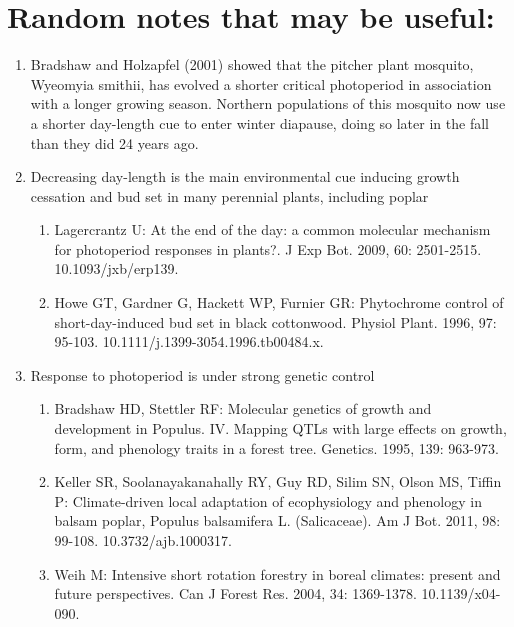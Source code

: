 \documentclass{article}
\begin{document}
\section* {Random notes that may be useful:}
\begin {enumerate}
\item Bradshaw and Holzapfel (2001) showed that the pitcher plant mosquito,
Wyeomyia smithii, has evolved a shorter critical photoperiod in association with a
longer growing season. Northern populations of this mosquito now use a shorter
day-length cue to enter winter diapause, doing so later in the fall than they did
24 years ago.
\item Decreasing day-length is the main environmental cue inducing growth cessation and bud set in many perennial plants, including poplar 
\begin{enumerate}

\item Lagercrantz U: At the end of the day: a common molecular mechanism for photoperiod responses in plants?. J Exp Bot. 2009, 60: 2501-2515. 10.1093/jxb/erp139.
\item Howe GT, Gardner G, Hackett WP, Furnier GR: Phytochrome control of short-day-induced bud set in black cottonwood. Physiol Plant. 1996, 97: 95-103. 10.1111/j.1399-3054.1996.tb00484.x.
\end{enumerate}

\item Response to photoperiod is under strong genetic control 
\begin{enumerate}
\item Bradshaw HD, Stettler RF: Molecular genetics of growth and development in Populus. IV. Mapping QTLs with large effects on growth, form, and phenology traits in a forest tree. Genetics. 1995, 139: 963-973.
\item Keller SR, Soolanayakanahally RY, Guy RD, Silim SN, Olson MS, Tiffin P: Climate-driven local adaptation of ecophysiology and phenology in balsam poplar, Populus balsamifera L. (Salicaceae). Am J Bot. 2011, 98: 99-108. 10.3732/ajb.1000317.
\item Weih M: Intensive short rotation forestry in boreal climates: present and future perspectives. Can J Forest Res. 2004, 34: 1369-1378. 10.1139/x04-090.
\end{enumerate}
\end {enumerate}

\clearpage
\end{document}
